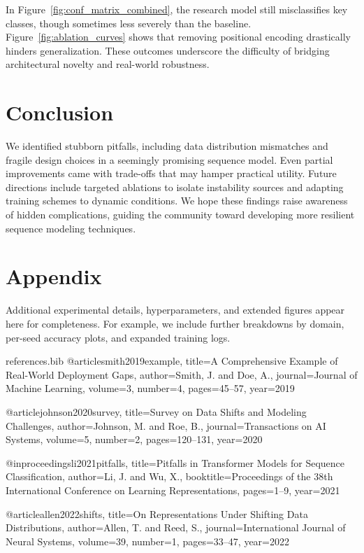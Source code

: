 \documentclass[11pt]{article}
\begin{document}
In Figure~\ref{fig:conf_matrix_combined}, the research model still misclassifies key classes, though sometimes less severely than the baseline. Figure~\ref{fig:ablation_curves} shows that removing positional encoding drastically hinders generalization. These outcomes underscore the difficulty of bridging architectural novelty and real-world robustness.

\section{Conclusion}
We identified stubborn pitfalls, including data distribution mismatches and fragile design choices in a seemingly promising sequence model. Even partial improvements came with trade-offs that may hamper practical utility. Future directions include targeted ablations to isolate instability sources and adapting training schemes to dynamic conditions. We hope these findings raise awareness of hidden complications, guiding the community toward developing more resilient sequence modeling techniques.

\newpage
\appendix
\section*{Appendix}
Additional experimental details, hyperparameters, and extended figures appear here for completeness. For example, we include further breakdowns by domain, per-seed accuracy plots, and expanded training logs.

\begin{filecontents}{references.bib}
@article{smith2019example,
  title={A Comprehensive Example of Real-World Deployment Gaps},
  author={Smith, J. and Doe, A.},
  journal={Journal of Machine Learning},
  volume={3},
  number={4},
  pages={45--57},
  year={2019}
}

@article{johnson2020survey,
  title={Survey on Data Shifts and Modeling Challenges},
  author={Johnson, M. and Roe, B.},
  journal={Transactions on AI Systems},
  volume={5},
  number={2},
  pages={120--131},
  year={2020}
}

@inproceedings{li2021pitfalls,
  title={Pitfalls in Transformer Models for Sequence Classification},
  author={Li, J. and Wu, X.},
  booktitle={Proceedings of the 38th International Conference on Learning Representations},
  pages={1--9},
  year={2021}
}

@article{allen2022shifts,
  title={On Representations Under Shifting Data Distributions},
  author={Allen, T. and Reed, S.},
  journal={International Journal of Neural Systems},
  volume={39},
  number={1},
  pages={33--47},
  year={2022}
}
\end{filecontents}



\end{document}
